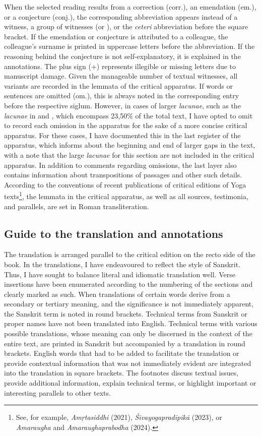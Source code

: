 When the selected reading results from a correction (corr.), an emendation (em.), or a conjecture (conj.), the corresponding abbreviation appears instead of a witness, a group of witnesses (\alpha or \beta), or the \textit{ceteri} abbreviation before the square bracket. If the emendation or conjecture is attributed to a colleague, the colleague's surname is printed in uppercase letters before the abbreviation. If the reasoning behind the conjecture is not self-explanatory, it is explained in the annotations. The plus sign (+) represents illegible or missing letters due to manuscript damage. Given the manageable number of textual witnesses, all variants are recorded in the lemmata of the critical apparatus. If words or sentences are omitted (om.), this is always noted in the corresponding entry before the respective siglum.
However, in cases of larger \textit{lacunae}, such as the \textit{lacunae} in  and , which encompass 23,50\% of the total text, I have opted to omit to record each omission in the apparatus for the sake of a more concise critical apparatus. For these cases, I have documented this in the last register of the apparatus, which informs about the beginning and end of larger gaps in the text, with a note that the large \textit{lacunae} for this section are not included in the critical apparatus. In addition to comments regarding omissions, the last layer also contains information about transpositions of passages and other such details.
According to the conventions of recent publications of critical editions of Yoga texts\footnote{See, for example, \emph{Amṛtasiddhi} (2021), \emph{Śivayogapradīpikā} (2023), or \emph{Amaraugha} and \emph{Amaraughaprabodha} (2024).}, the lemmata in the critical apparatus, as well as all sources, testimonia, and parallels, are set in Roman transliteration.

\subsection{Guide to the translation and annotations}

The translation is arranged parallel to the critical edition on the recto side of the book. In the translations, I have endeavoured to reflect the style of Sanskrit. Thus, I have sought to balance literal and idiomatic translation well. Verse insertions have been enumerated according to the numbering of the sections and clearly marked as such. When translations of certain words derive from a secondary or tertiary meaning, and the significance is not immediately apparent, the Sanskrit term is noted in round brackets. Technical terms from Sanskrit or proper names have not been translated into English. Technical terms with various possible translations, whose meaning can only be discerned in the context of the entire text, are printed in Sanskrit but accompanied by a translation in round brackets. English words that had to be added to facilitate the translation or provide contextual information that was not immediately evident are integrated into the translation in square brackets. The footnotes discuss textual issues, provide additional information, explain technical terms, or highlight important or interesting parallels to other texts.

